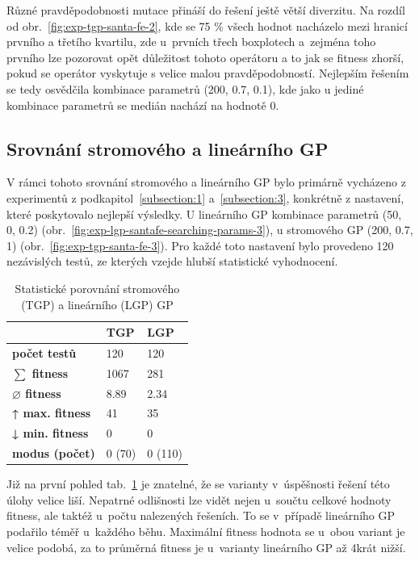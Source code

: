 Různé pravděpodobnosti mutace přináší do řešení ještě větší diverzitu. Na rozdíl od obr.~\ref{fig:exp-tgp-santa-fe-2}, kde se 75 \% všech hodnot nacházelo mezi hranicí prvního a třetího kvartilu, zde u~prvních třech boxplotech a~zejména toho prvního lze pozorovat opět důležitost tohoto operátoru a to jak se fitness zhorší, pokud se operátor vyskytuje s velice malou pravděpodobností. Nejlepším řešením se tedy osvědčila kombinace parametrů (200, 0.7, 0.1), kde jako u jediné kombinace parametrů se medián nachází na hodnotě 0.

\clearpage
\subsection{Srovnání stromového a lineárního GP}
V rámci tohoto srovnání stromového a lineárního GP bylo primárně vycházeno z experimentů z podkapitol~\ref{subsection:1} a~\ref{subsection:3}, konkrétně z nastavení, které poskytovalo nejlepší výsledky. U lineárního GP kombinace parametrů (50, 0, 0.2) (obr.~\ref{fig:exp-lgp-santafe-searching-params-3}), u stromového GP (200, 0.7, 1) (obr.~\ref{fig:exp-tgp-santa-fe-3}). Pro každé toto nastavení bylo provedeno 120 nezávislých testů, ze kterých vzejde hlubší statistické vyhodnocení.

\begin{table}[!h]
\centering
\begin{tabular}{|l|l|l|}
\hline                               & \textbf{TGP} & \textbf{LGP} \\ \hline
\textbf{počet testů}                 & 120          & 120          \\ \hline
\textbf{$\sum$ fitness}          &   1067         &  	281            \\ \hline
\textbf{$\varnothing$ fitness}                   & 8.89         & 2.34             \\ \hline
\textbf{↑ max. fitness}              & 41           &  35            \\ \hline
\textbf{↓ min. fitness}              & 0            &  0            \\ \hline
\textbf{modus (počet)}              & 0 (70)       &  0 (110)           \\ \hline
\end{tabular}
\caption{Statistické porovnání stromového (TGP) a lineárního (LGP) GP}
\label{tab:stats-tgp-lgp-comp}
\end{table}

Již na první pohled tab.~\ref{tab:stats-tgp-lgp-comp} je znatelné, že se  varianty v~úspěšnosti řešení této úlohy velice liší. Nepatrné odlišnosti lze vidět nejen u~součtu celkové hodnoty fitness, ale taktéž u~počtu nalezených řešeních. To se v~případě lineárního GP podařilo téměř u~každého běhu. Maximální fitness hodnota se u~obou variant je velice podobá, za to průměrná fitness je u~varianty lineárního GP až 4krát nižší.

